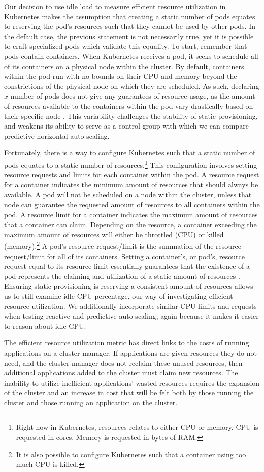 Our decision to use idle load to measure efficient resource utilization
in Kubernetes makes the assumption that
creating a static number of pods equates to reserving the pod's resources such
that they cannot be used by other pods.
In the default case, the previous statement is not necessarily true,
yet it is possible to craft specialized pods which validate this equality. To
start, remember that pods contain containers. When Kubernetes receives a pod, it
seeks to schedule all of its containers on a physical node within the cluster.
By default, containers within the pod run with no bounds on their CPU and memory
beyond the constrictions of the physical node on which they are scheduled. As such,
declaring $x$ number of pods does not give any guarantees of resource usage, as
the amount of resources available to the containers within the pod vary
drastically based on their specific node \cite{k8s-limit-range}. This variability challenges the
stability of static provisioning, and weakens its ability to serve as a control
group with which we can compare predictive horizontal auto-scaling.

Fortunately, there is a way to configure Kubernetes such that a static number of
pods equates to a static number of resources.\footnote{Right now in Kubernetes,
resources relates to either CPU or memory. CPU is requested in cores. Memory is
requested in bytes of RAM.} This configuration involves
setting resource requests and limits for each container within the pod. A
resource request for a container indicates the minimum amount of resources that
should always be available. A pod will not be scheduled on a node within the
cluster, unless that node can guarantee the requested amount of resources to all
containers within the pod. A resource limit for a container indicates the
maximum amount of resources that a container can claim. Depending on the
resource, a container exceeding the maximum amount of resources will either be
throttled (CPU) or killed (memory).\footnote{It is also possible to configure
Kubernetes such that a container using too much CPU is killed.} A pod's resource
request/limit is the summation of the resource request/limit for all of its
containers. Setting a container's, or pod's, resource request equal to its
resource limit essentially guarantees that the existence of a pod represents the
claiming and utilization of a static amount of resources
\cite{k8s-compute-resources}. Ensuring static provisioning
is reserving a consistent amount of resources
allows us to still examine idle CPU percentage, our way of investigating
efficient resource utilization. We additionally incorporate similar CPU limits
and requests when testing reactive and predictive auto-scaling, again because it
makes it easier to reason about idle CPU.

The efficient resource utilization metric has direct links to the costs of
running applications on a cluster manager. If applications are given resources
they do not need, and the cluster manager does not reclaim these unused
resources, then additional applications added to the cluster must claim new
resources. The inability to utilize inefficient applications' wasted resources
requires the expansion of the cluster and an increase in cost that will be felt
both by those running the cluster and those running an application on the
cluster.
